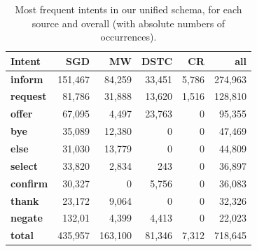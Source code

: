 \begin{table}[tp]
    \centering\footnotesize
    \begin{tabular}{l>{\hspace{-3mm}}r>{\hspace{-2mm}}rrr>{\hspace{-2mm}}r}
        \toprule
        \bf Intent &
        \textbf{SGD} & 
        \textbf{MW} &
        \textbf{DSTC} &
        \textbf{CR} &
         \textbf{all}\\ \midrule
        \textbf{inform} & 151,467 & 84,259 & 33,451 & 5,786 & 274,963\\ 
        \textbf{request} & 81,786 & 31,888 & 13,620 & 1,516 & 128,810\\ 
        \textbf{offer} & 67,095 & 4,497 & 23,763 & 0 & 95,355\\ 
        \textbf{bye} & 35,089 & 12,380 & 0 & 0 & 47,469\\ 
        \textbf{else}& 31,030 & 13,779 & 0 & 0 & 44,809 \\ 
        \textbf{select}& 33,820 & 2,834 & 243 & 0 & 36,897\\ 
        \textbf{confirm}& 30,327 & 0 & 5,756 & 0 & 36,083\\
        \textbf{thank}& 23,172 & 9,064 & 0 & 0 & 32,326\\ 
        \textbf{negate}& 132,01 & 4,399 & 4,413 & 0 & 22,023\\ 
        \midrule
        \textbf{total}& 435,957 & 163,100 & 81,346 & 7,312 & 718,645\\
        \bottomrule
    \end{tabular}
    \caption{Most frequent intents in our unified schema, for each source and overall (with absolute numbers of occurrences).}
    \label{tab:intents}
\end{table}

